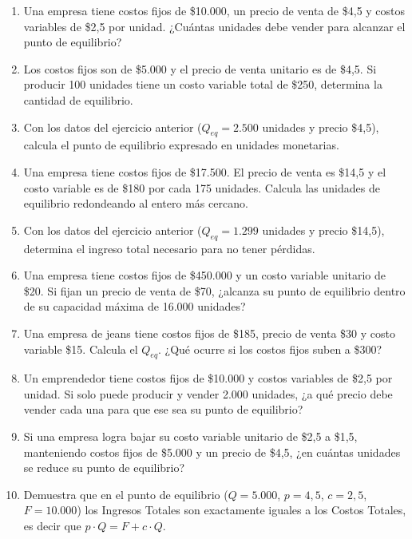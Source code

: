 \documentclass[12pt,a4paper]{article}
\newcommand{\answerspace}{\vspace{4.5cm}}
\newcommand{\lastanswerspace}{\vspace{2cm}}
\begin{document}
\begin{enumerate}[label=\textbf{\arabic*.}, leftmargin=*, itemsep=0pt]

\item Una empresa tiene costos fijos de \$10.000, un precio de venta de \$4,5 y costos variables de \$2,5 por unidad. ¿Cuántas unidades debe vender para alcanzar el punto de equilibrio?
\answerspace

\item Los costos fijos son de \$5.000 y el precio de venta unitario es de \$4,5. Si producir 100 unidades tiene un costo variable total de \$250, determina la cantidad de equilibrio.
\answerspace

\item Con los datos del ejercicio anterior ($Q_{eq} = 2.500$ unidades y precio \$4,5), calcula el punto de equilibrio expresado en unidades monetarias.
\answerspace

\item Una empresa tiene costos fijos de \$17.500. El precio de venta es \$14,5 y el costo variable es de \$180 por cada 175 unidades. Calcula las unidades de equilibrio redondeando al entero más cercano.
\answerspace

\item Con los datos del ejercicio anterior ($Q_{eq} = 1.299$ unidades y precio \$14,5), determina el ingreso total necesario para no tener pérdidas.
\answerspace

\item Una empresa tiene costos fijos de \$450.000 y un costo variable unitario de \$20. Si fijan un precio de venta de \$70, ¿alcanza su punto de equilibrio dentro de su capacidad máxima de 16.000 unidades?
\answerspace

\item Una empresa de jeans tiene costos fijos de \$185, precio de venta \$30 y costo variable \$15. Calcula el $Q_{eq}$. ¿Qué ocurre si los costos fijos suben a \$300?
\answerspace

\item Un emprendedor tiene costos fijos de \$10.000 y costos variables de \$2,5 por unidad. Si solo puede producir y vender 2.000 unidades, ¿a qué precio debe vender cada una para que ese sea su punto de equilibrio?
\answerspace

\item Si una empresa logra bajar su costo variable unitario de \$2,5 a \$1,5, manteniendo costos fijos de \$5.000 y un precio de \$4,5, ¿en cuántas unidades se reduce su punto de equilibrio?
\answerspace

\item Demuestra que en el punto de equilibrio ($Q = 5.000$, $p = 4{,}5$, $c = 2{,}5$, $F = 10.000$) los Ingresos Totales son exactamente iguales a los Costos Totales, es decir que $p \cdot Q = F + c \cdot Q$.
\lastanswerspace

\end{enumerate}
\end{document}
